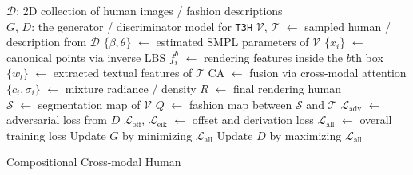 \documentclass[11pt]{article}
\begin{document}
\begin{algorithm}[t]
    \begin{algorithmic}[1]
        \small
        \State $\mathcal{D}$: 2D collection of human images / fashion descriptions
        \\
        \State $G$, $D$: the generator / discriminator model for \texttt{T3H}
            \State $\mathcal{V}$, $\mathcal{T}$ $\gets$ sampled human / description from $\mathcal{D}$
            \State $\{\beta, \theta\}$ $\gets$ estimated SMPL parameters of $\mathcal{V}$
            \State $\{x_i\}$ $\gets$ canonical points via inverse LBS 
            \State $f^b_i$ $\gets$ rendering features inside the $b$th box 
            \State $\{w_l\}$ $\gets$ extracted textual features of $\mathcal{T}$
            \State CA $\gets$ fusion via cross-modal attention 
            \State $\{c_i, \sigma_i\}$ $\gets$ mixture radiance / density 
            \State $R$ $\gets$ final rendering human 
            \\
            \State $\mathcal{S}$ $\gets$ segmentation map of $\mathcal{V}$
            \State $Q$ $\gets$ fashion map between $\mathcal{S}$ and $\mathcal{T}$ 
            \State $\mathcal{L}_\text{adv}$ $\gets$ adversarial loss from $D$ 
            \State $\mathcal{L}_\text{off}$, $\mathcal{L}_\text{eik}$ $\gets$ offset and derivation loss 
            \State $\mathcal{L}_\text{all}$ $\gets$ overall training loss 
            \State Update $G$ by minimizing $\mathcal{L}_\text{all}$
            \State Update $D$ by maximizing $\mathcal{L}_\text{all}$
        \EndWhile
    \end{algorithmic}
    \caption{Compositional Cross-modal Human}
    \label{algo:cch}
\end{algorithm}
\end{document}
